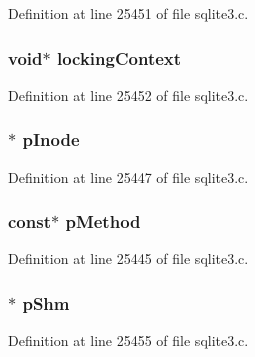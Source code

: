 Definition at line 25451 of file sqlite3.\+c.

\hypertarget{structunix_file_aab5edf9be7a69d30e33ed8d8a89291ea}{}
\subsubsection[{locking\+Context}]{\setlength{\rightskip}{0pt plus 5cm}void$\ast$ locking\+Context}\label{structunix_file_aab5edf9be7a69d30e33ed8d8a89291ea}


Definition at line 25452 of file sqlite3.\+c.

\hypertarget{structunix_file_afe19cb877f2c3a50ca04a8272ed435b8}{}
\subsubsection[{p\+Inode}]{$\ast$ p\+Inode}\label{structunix_file_afe19cb877f2c3a50ca04a8272ed435b8}


Definition at line 25447 of file sqlite3.\+c.

\hypertarget{structunix_file_a4543ba4f315142783b138112898c5c59}{}
\subsubsection[{p\+Method}]{ const$\ast$ p\+Method}\label{structunix_file_a4543ba4f315142783b138112898c5c59}


Definition at line 25445 of file sqlite3.\+c.

\hypertarget{structunix_file_aa155aff7111790d83ffdb16892b15dae}{}
\subsubsection[{p\+Shm}]{$\ast$ p\+Shm}\label{structunix_file_aa155aff7111790d83ffdb16892b15dae}


Definition at line 25455 of file sqlite3.\+c.

\hypertarget{structunix_file_a7ecad57bed967765906dd7d10af97be1}{}
